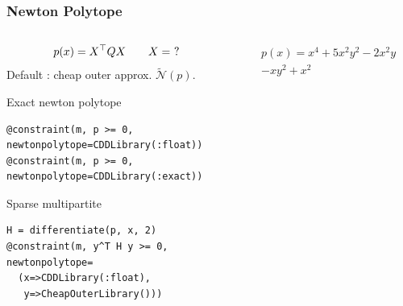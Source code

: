 \documentclass{beamer}
\begin{document}
  \begin{frame}[fragile]
    \frametitle{Newton Polytope}
    \begin{columns}
      \begin{column}{0.6\textwidth}
        \[ p(x) = X^\top Q X \qquad X = \ ? \]
        Default : cheap outer approx. $\tilde{\mathcal{N}}(p)$.
        \begin{block}{Exact newton polytope}
\begin{verbatim}
@constraint(m, p >= 0,
newtonpolytope=CDDLibrary(:float))
@constraint(m, p >= 0,
newtonpolytope=CDDLibrary(:exact))
\end{verbatim}
        \end{block}
        \vspace{-1em}
        \begin{block}{Sparse multipartite}
        \vspace{-1em}
\begin{verbatim}
H = differentiate(p, x, 2)
@constraint(m, y^T H y >= 0,
newtonpolytope=
  (x=>CDDLibrary(:float),
   y=>CheapOuterLibrary()))
\end{verbatim}
        \end{block}
      \end{column}
      \begin{column}{0.4\textwidth}
        \begin{multline*}
          p(x) = x^4 + 5x^2y^2 - 2x^2y\\- xy^2 + x^2
        \end{multline*}
        \centering
        \tiny
      \end{column}
    \end{columns}
  \end{frame}
\end{document}
